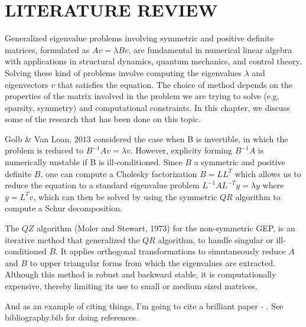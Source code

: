 \chapter{LITERATURE REVIEW}

Generalized eigenvalue problems involving symmetric and positive definite matrices, formulated as $Av = \lambda Bv$, are fundamental in numerical linear algebra with applications in structural  dynamics, quantum mechanics, and control theory. Solving these kind of problems involve computing the eigenvalues $\lambda$ and eigenvectors $v$ that satisfies the equation. The choice of method depends on the properties of the matrix involved in the problem we are trying to solve (e.g, sparsity, symmetry) and computational constraints. In this chapter, we discuss some of the research that has been done on this topic.\par
Golb \& Van Loan, $2013$ considered the case when B is invertible, in which the problem is reduced to $B^{-1}Av = \lambda v$. However, explicity forming $B^{-1}A$ is numerically unstable if B is ill-conditioned. Since $B$ a symmetric and positive definite $B$, one can compute a Cholesky factorization $B = LL^{T}$ which allows us to  reduce the equation to a standard eigenvalue problem $L^{-1}AL^{-T}y = \lambda y$ where $y= L^T v$, which can then be solved by using the symmetric $QR$ algorithm to compute a Schur decomposition.\par
The $QZ$ algorithm (Moler and Stewart, 1973) for the non-symmetric GEP, is an iterative method that generalized the $QR$ algorithm, to handle singular or ill-conditioned $B$. It applies orthogonal transformations to simutaneously reduce $A$ and $B$ to upper triangular forms from which the eigenvalues are extracted. Although this method is robust and backward stable, it is computationally expensive, thereby limiting its use to small or medium sized matrices.\par

And as an example of citing things, I'm going to cite a brilliant paper - \citep{jones_2016}. See bibliography.bib for doing references.

